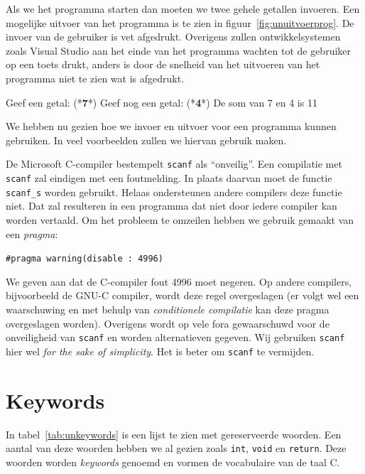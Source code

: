 Als we het programma starten dan moeten we twee gehele getallen invoeren. Een mogelijke uitvoer van het programma is te zien in figuur~\ref{fig:unuitvoerprog}. De invoer van de gebruiker is vet afgedrukt.
Overigens zullen ontwikkelsystemen zoals Visual Studio aan het einde van het programma wachten tot de gebruiker op een toets drukt, anders is door de snelheid van het uitvoeren van het programma niet te zien wat is afgedrukt.

\begin{dosbox}[title=Uitvoer van het programma in listing~\ref{cod:sumoftwo}.,label=fig:unuitvoerprog]
Geef een getal: (*\textbf{7}*)
Geef nog een getal: (*\textbf{4}*)
De som van 7 en 4 is 11
\end{dosbox}

We hebben nu gezien hoe we invoer en uitvoer voor een programma kunnen gebruiken. In veel voorbeelden zullen we hiervan gebruik maken.

\begin{infobox}
\label{fig:unopmerkingscanf}%
De Microsoft C-compiler bestempelt \texttt{scanf} als ``onveilig''. Een compilatie met \texttt{scanf} zal eindigen met een foutmelding. In plaats daarvan moet de functie \texttt{scanf\_s} worden gebruikt. Helaas ondersteunen andere compilers deze functie niet. Dat zal resulteren in een programma dat niet door iedere compiler kan worden vertaald. Om het probleem te omzeilen hebben we gebruik gemaakt van een \textsl{pragma}:

\hspace*{1em}\texttt{\#pragma warning(disable : 4996)}

We geven aan dat de C-compiler fout 4996 moet negeren. Op andere compilers, bijvoorbeeld de GNU-C compiler, wordt deze regel overgeslagen (er volgt wel een waarschuwing en met behulp van \textsl{conditionele compilatie} kan deze pragma overgeslagen worden). Overigens wordt op vele fora gewaarschuwd voor de onveiligheid van \texttt{scanf} en worden alternatieven gegeven. Wij gebruiken \texttt{scanf} hier wel \textsl{for the sake of simplicity}. Het is beter om \texttt{scanf} te vermijden.
\end{infobox}

\section{Keywords}

In tabel~\ref{tab:unkeywords} is een lijst te zien met gereserveerde woorden. Een aantal van deze woorden hebben we al gezien zoals \texttt{int}, \texttt{void} en \texttt{return}. Deze woorden worden \textsl{keywords} genoemd en vormen de vocabulaire van de taal C.

